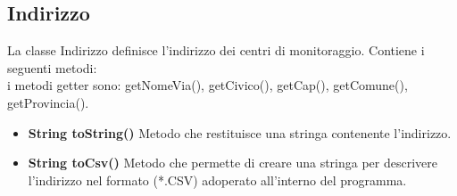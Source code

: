 \documentclass[a4paper, 12pt]{report}
\begin{document}
			\subsection{Indirizzo}
			La classe Indirizzo definisce l'indirizzo dei centri di monitoraggio. Contiene i seguenti metodi:\\
			i metodi getter sono: getNomeVia(), getCivico(), getCap(), getComune(), getProvincia().
			\begin{itemize}
			\item \textbf{String toString()}
			Metodo che restituisce una stringa contenente l'indirizzo.
			\item \textbf{String toCsv()}
			Metodo che permette di creare una stringa per descrivere l'indirizzo nel formato (*.CSV) adoperato all'interno del programma.
			\end{itemize}
			 
\end{document}
